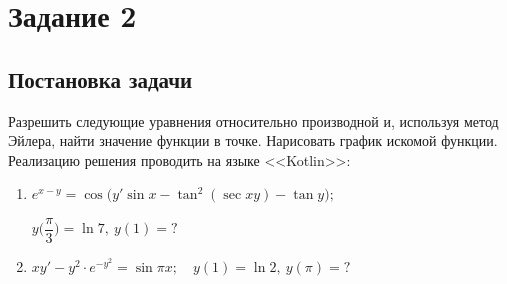 \documentclass[a4paper, 14pt, fleqn]{extarticle}
\begin{document}
	\pagebreak
	\section{Задание 2}
		\subsection{Постановка задачи}
			\noindent Разрешить следующие уравнения относительно производной и, используя метод Эйлера, найти значение функции в точке.
 					Нарисовать график искомой функции. Реализацию решения проводить на языке <<Kotlin>>:
			\begin{enumerate}
				\item \( e^{x-y} = \cos{\big(y'\sin{x} - \tan^2{(\sec{xy})} - \tan{y}\big)}; \)

					\( y\bigg(\dfrac{\pi}{3}\bigg) = \ln{7},\ y(1) = ? \)

				\item \( xy' - y^2 \cdot e^{-y^2} = \sin{\pi x}; \quad y(1) = \ln{2},\  y{(\pi)} = ?\)
			\end{enumerate}
\end{document}
